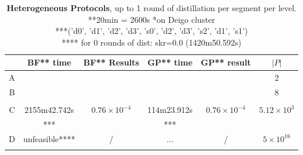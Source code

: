 \documentclass{article}
\begin{document}
\begin{table}[h!]
    \centering
    \begin{tabular}{|c|c|c|c|c|c|}
        \hline
        & BF** time & BF** Results & GP** time & GP** result & $|P|$ \\
        \hline
        \hline
        A & & & & & 2 \\
        \hline
        B & & & & & 8 \\
          & & & & & \\
        \hline
        C & 2155m42.742s & $0.76 \times 10^{-4}$ & 114m23.912s & $0.76 \times 10^{-4}$ & $5.12 \times 10^{3}$ \\
          & *** & & *** & & \\
        \hline
        D & unfeasible**** & / & ... & / & $5 \times 10^{16}$ \\
          & & & & & \\
        \hline
    \end{tabular}
    \caption{\textbf{Heterogeneous Protocols}, up to 1 round of distillation per segment per level. \\**20min = 2600s \quad **on Deigo cluster \\ ***('d0', 'd1', 'd2', 'd3', 's0', 'd2', 'd3', 's2', 'd1', 's1') \\ **** for 0 rounds of dist: skr=0.0 (1420m50.592s) }
\end{table}
\end{document}
